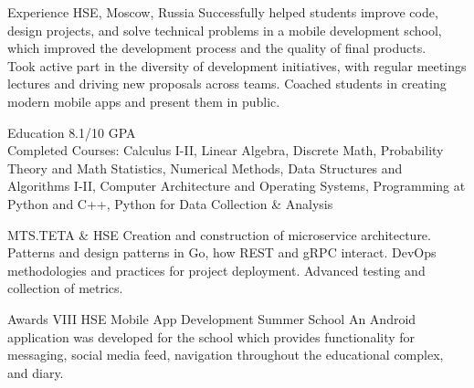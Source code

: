 \documentclass[]{resume-knyte}
\begin{document}
\begin{topic}{Experience}
    {HSE, Moscow, Russia}
    {Successfully helped students improve code, design projects, and solve technical problems in a mobile development school, which improved the development process and the quality of final products.
    \\
    Took active part in the diversity of development initiatives, with regular meetings lectures and driving new proposals across teams. Coached students in creating modern mobile apps and present them in public.}
\end{topic}

\begin{topic}{Education}
    {8.1/10 GPA
    \\
    Completed Courses: Calculus I-II, Linear Algebra, Discrete Math, Probability Theory and Math Statistics, Numerical Methods, Data Structures and Algorithms I-II, Computer Architecture and Operating Systems, Programming at Python and C++, Python for Data Collection \& Analysis}

    {MTS.TETA \& HSE}
    {Creation and construction of microservice architecture. Patterns and design patterns in Go, how REST and gRPC interact. DevOps methodologies and practices for project deployment. Advanced testing and collection of metrics.}
    
\end{topic}

\begin{topic}{Awards}
    {VIII HSE Mobile App Development Summer School}
    {An Android application was developed for the school which provides functionality for messaging, social media feed, navigation throughout the educational complex, and diary.}
\end{topic}
\end{document}
